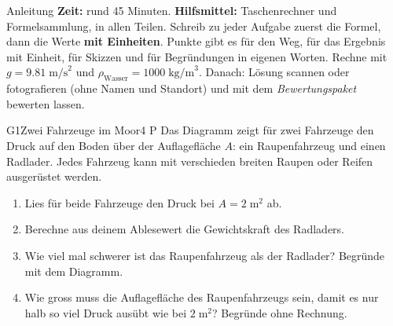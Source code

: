 \documentclass[11pt]{article}
\begin{document}

\begin{lpinfo}{Anleitung}
\textbf{Zeit:} rund 45 Minuten. \textbf{Hilfsmittel:} Taschenrechner und Formelsammlung, in allen Teilen.
Schreib zu jeder Aufgabe zuerst die Formel, dann die Werte \textbf{mit Einheiten}. Punkte gibt es für den Weg,
für das Ergebnis mit Einheit, für Skizzen und für Begründungen in eigenen Worten. Rechne mit $g = 9.81\;\text{m/s}^2$ und
$\rho_\text{Wasser} = 1000\;\text{kg/m}^3$.
Danach: Lösung scannen oder fotografieren (ohne Namen und Standort) und mit dem \emph{Bewertungspaket} bewerten lassen.
\end{lpinfo}


\begin{lpaufgabe}{G1}{Zwei Fahrzeuge im Moor}{4 P}
Das Diagramm zeigt für zwei Fahrzeuge den Druck auf den Boden über der Auflagefläche \(A\): ein Raupenfahrzeug und einen Radlader. Jedes Fahrzeug kann mit verschieden breiten Raupen oder Reifen ausgerüstet werden.\par\smallskip
\begin{center}\end{center}
\begin{enumerate}[label=\alph*),leftmargin=*,itemsep=2pt,topsep=2pt]
\item Lies für beide Fahrzeuge den Druck bei \(A = 2\;\text{m}^2\) ab.
\item Berechne aus deinem Ablesewert die Gewichtskraft des Radladers.
\item Wie viel mal schwerer ist das Raupenfahrzeug als der Radlader? Begründe mit dem Diagramm.
\item Wie gross muss die Auflagefläche des Raupenfahrzeugs sein, damit es nur halb so viel Druck ausübt wie bei \(2\;\text{m}^2\)? Begründe ohne Rechnung.
\end{enumerate}
\end{lpaufgabe}
\end{document}
